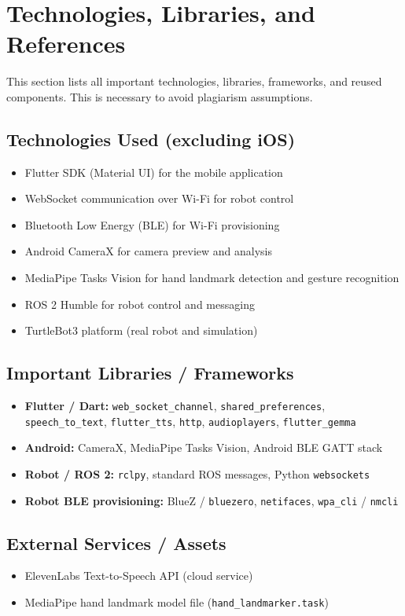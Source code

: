 \documentclass[11pt,a4paper]{article}
\begin{document}
\newpage
\section{Technologies, Libraries, and References}

This section lists all important technologies, libraries, frameworks, and reused components.
This is necessary to avoid plagiarism assumptions.

\subsection{Technologies Used (excluding iOS)}
\begin{itemize}[leftmargin=1.5cm]
	\item Flutter SDK (Material UI) for the mobile application
	\item WebSocket communication over Wi-Fi for robot control
	\item Bluetooth Low Energy (BLE) for Wi-Fi provisioning
	\item Android CameraX for camera preview and analysis
	\item MediaPipe Tasks Vision for hand landmark detection and gesture recognition
	\item ROS 2 Humble for robot control and messaging
	\item TurtleBot3 platform (real robot and simulation)
\end{itemize}

\subsection{Important Libraries / Frameworks}
\begin{itemize}[leftmargin=1.5cm]
	\item \textbf{Flutter / Dart:} \texttt{web\_socket\_channel}, \texttt{shared\_preferences}, \texttt{speech\_to\_text},
	\texttt{flutter\_tts}, \texttt{http}, \texttt{audioplayers}, \texttt{flutter\_gemma}
	\item \textbf{Android:} CameraX, MediaPipe Tasks Vision, Android BLE GATT stack
	\item \textbf{Robot / ROS 2:} \texttt{rclpy}, standard ROS messages, Python \texttt{websockets}
	\item \textbf{Robot BLE provisioning:} BlueZ / \texttt{bluezero}, \texttt{netifaces}, \texttt{wpa\_cli} / \texttt{nmcli}
\end{itemize}

\subsection{External Services / Assets}
\begin{itemize}[leftmargin=1.5cm]
	\item ElevenLabs Text-to-Speech API (cloud service)
	\item MediaPipe hand landmark model file (\texttt{hand\_landmarker.task})
\end{itemize}
\end{document}
